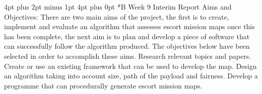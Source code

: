\documentclass[12pt,a4paper,oneside]{book}
\makeatletter
\renewcommand\section{\@startsection {section}{1}{0mm} %
                               {4pt plus 2pt minus 1pt} %
                               {4pt plus 0pt} %
                               {\bfseries}}
\makeatother
\begin{document}
\begin{appendices}
\section*{B Week 9 Interim Report}
Aims and Objectives:
There are two main aims of the project, the first is to create, implement and evaluate an algorithm that assesses escort mission maps once this has been complete, the next aim is to plan and develop a piece of software that can successfully follow the algorithm produced. The objectives below have been selected in order to accomplish these aims.
Research relevant topics and papers.
Create or use an existing framework that can be used to develop the map.
Design an algorithm taking into account size, path of the payload and fairness.
Develop a programme that can procedurally generate escort mission maps.


\end{appendices}
\end{document}
